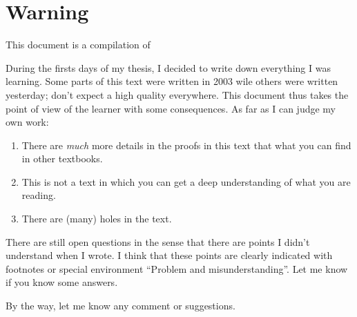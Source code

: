 \section{Warning}

This document is a compilation of 

During the firsts days of my thesis, I decided to write down everything I was learning. Some parts of this text were written in 2003 wile others were written yesterday; don't expect a high quality everywhere. This document thus takes the point of view of the learner with some consequences. As far as I can judge my own work:
\begin{enumerate}
    \item
        There are \emph{much} more details in the proofs in this text that what you can find in other textbooks.
    \item
        This is not a text in which you can get a deep understanding of what you are reading.
    \item
        There are (many) holes in the text.
\end{enumerate}

There are still open questions in the sense that there are points I didn't understand when I wrote. I think that these points are clearly indicated with footnotes or special environment ``Problem and misunderstanding''. Let me know if you know some answers.

By the way, let me know any comment or suggestions.
